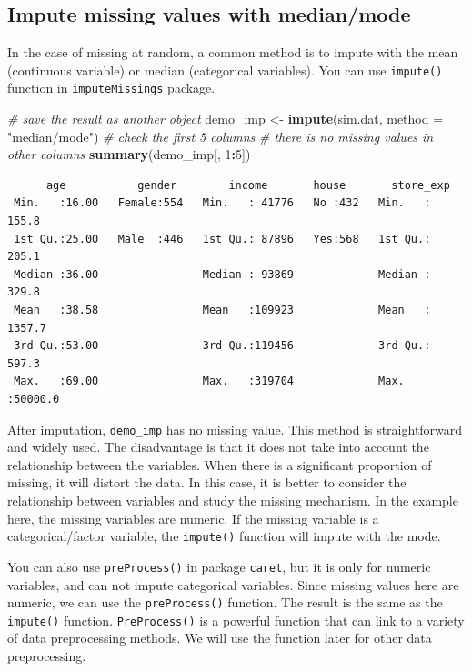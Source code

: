 \documentclass[12pt,]{krantz}
\makeatletter
\newenvironment{Shaded}{\begin{snugshade}}{\end{snugshade}}
\newcommand{\CommentTok}[1]{\textcolor[rgb]{0.37,0.37,0.37}{\textit{#1}}}
\newcommand{\DataTypeTok}[1]{\textcolor[rgb]{0.27,0.27,0.27}{#1}}
\newcommand{\DecValTok}[1]{\textcolor[rgb]{0.06,0.06,0.06}{#1}}
\newcommand{\KeywordTok}[1]{\textcolor[rgb]{0.27,0.27,0.27}{\textbf{#1}}}
\newcommand{\NormalTok}[1]{#1}
\newcommand{\OperatorTok}[1]{\textcolor[rgb]{0.43,0.43,0.43}{\textbf{#1}}}
\newcommand{\StringTok}[1]{\textcolor[rgb]{0.5,0.5,0.5}{#1}}
\newenvironment{kframe}{%
\medskip{}
\setlength{\fboxsep}{.8em}
 \def\at@end@of@kframe{}%
 \ifinner\ifhmode%
  \def\at@end@of@kframe{\end{minipage}}%
  \begin{minipage}{\columnwidth}%
 \fi\fi%
 \def\FrameCommand##1{\hskip\@totalleftmargin \hskip-\fboxsep
 \colorbox{shadecolor}{##1}\hskip-\fboxsep
     \hskip-\linewidth \hskip-\@totalleftmargin \hskip\columnwidth}%
 \MakeFramed {\advance\hsize-\width
   \@totalleftmargin\z@ \linewidth\hsize
   \@setminipage}}%
 {\par\unskip\endMakeFramed%
 \at@end@of@kframe}
\renewenvironment{Shaded}{\begin{kframe}}{\end{kframe}}
\makeatother
\begin{document}
\hypertarget{impute-missing-values-with-medianmode}{%
\subsection{Impute missing values with median/mode}\label{impute-missing-values-with-medianmode}}

In the case of missing at random, a common method is to impute with the mean (continuous variable) or median (categorical variables). You can use \texttt{impute()} function in \texttt{imputeMissings} package.

\begin{Shaded}
\begin{Highlighting}[]
\CommentTok{# save the result as another object}
\NormalTok{demo_imp <-}\StringTok{ }\KeywordTok{impute}\NormalTok{(sim.dat, }\DataTypeTok{method =} \StringTok{"median/mode"}\NormalTok{)}
\CommentTok{# check the first 5 columns}
\CommentTok{# there is no missing values in other columns}
\KeywordTok{summary}\NormalTok{(demo_imp[, }\DecValTok{1}\OperatorTok{:}\DecValTok{5}\NormalTok{])}
\end{Highlighting}
\end{Shaded}

\begin{verbatim}
      age           gender        income       house       store_exp      
 Min.   :16.00   Female:554   Min.   : 41776   No :432   Min.   :  155.8  
 1st Qu.:25.00   Male  :446   1st Qu.: 87896   Yes:568   1st Qu.:  205.1  
 Median :36.00                Median : 93869             Median :  329.8  
 Mean   :38.58                Mean   :109923             Mean   : 1357.7  
 3rd Qu.:53.00                3rd Qu.:119456             3rd Qu.:  597.3  
 Max.   :69.00                Max.   :319704             Max.   :50000.0
\end{verbatim}

After imputation, \texttt{demo\_imp} has no missing value. This method is straightforward and widely used. The disadvantage is that it does not take into account the relationship between the variables. When there is a significant proportion of missing, it will distort the data. In this case, it is better to consider the relationship between variables and study the missing mechanism. In the example here, the missing variables are numeric. If the missing variable is a categorical/factor variable, the \texttt{impute()} function will impute with the mode.

You can also use \texttt{preProcess()} in package \texttt{caret}, but it is only for numeric variables, and can not impute categorical variables. Since missing values here are numeric, we can use the \texttt{preProcess()} function. The result is the same as the \texttt{impute()} function. \texttt{PreProcess()} is a powerful function that can link to a variety of data preprocessing methods. We will use the function later for other data preprocessing.
\end{document}
